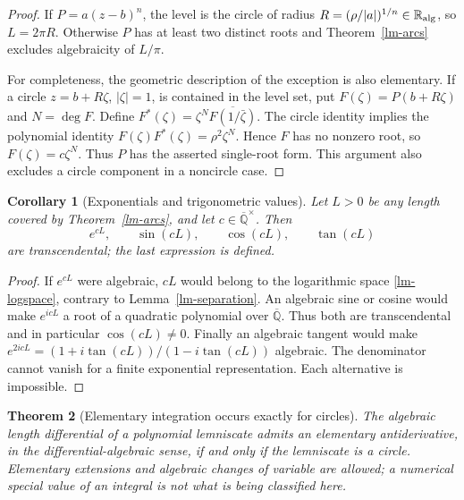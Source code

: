 \documentclass[11pt,a4paper]{article}
\newtheorem{theorem}{Theorem}[section]
\newtheorem{corollary}[theorem]{Corollary}
\theoremstyle{definition}
\theoremstyle{remark}
\numberwithin{equation}{section}
\newcommand{\Qbar}{\overline{\mathbb Q}}
\begin{document}
\begin{proof}
If $P=a(z-b)^n$, the level is the circle of radius
$R=(\rho/|a|)^{1/n}\in\mathbb R_{\rm alg}$, so $L=2\pi R$.
Otherwise $P$ has at least two distinct roots and
Theorem~\ref{lm-arcs} excludes algebraicity of $L/\pi$.

For completeness, the geometric description of the exception is also
elementary.  If a circle $z=b+R\zeta$, $|\zeta|=1$, is contained in the
level set, put $F(\zeta)=P(b+R\zeta)$ and $N=\deg F$.  Define
$F^*(\zeta)=\zeta^N\overline{F(1/\bar\zeta)}$.
The circle identity implies the polynomial identity
$F(\zeta)F^*(\zeta)=\rho^2\zeta^N$.  Hence $F$ has no nonzero root,
so $F(\zeta)=c\zeta^N$.  Thus $P$ has the asserted single-root form.
This argument also excludes a circle component in a noncircle case.
\end{proof}

\begin{corollary}[Exponentials and trigonometric values]\label{lm-exponentials}
Let $L>0$ be any length covered by Theorem~\ref{lm-arcs}, and let
$c\in\Qbar^\times$.  Then
\[
 e^{cL},\qquad \sin(cL),\qquad \cos(cL),\qquad \tan(cL)
\]
are transcendental; the last expression is defined.
\end{corollary}

\begin{proof}
If $e^{cL}$ were algebraic, $cL$ would belong to the logarithmic space
\eqref{lm-logspace}, contrary to Lemma~\ref{lm-separation}.  An algebraic
sine or cosine would make $e^{icL}$ a root of a quadratic polynomial over
$\Qbar$.  Thus both are transcendental and in particular $\cos(cL)\ne0$.
Finally an algebraic tangent would make
$e^{2icL}=(1+i\tan(cL))/(1-i\tan(cL))$ algebraic.  The denominator cannot
vanish for a finite exponential representation.  Each alternative is
impossible.
\end{proof}

\begin{theorem}[Elementary integration occurs exactly for circles]
\label{lm-elementary}
The algebraic length differential of a polynomial lemniscate admits an
elementary antiderivative, in the differential-algebraic sense, if and
only if the lemniscate is a circle.  Elementary extensions and algebraic
changes of variable are allowed; a numerical special value of an
integral is not what is being classified here.
\end{theorem}
\end{document}
